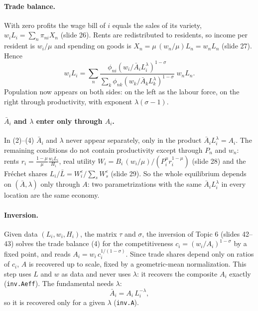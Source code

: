 \documentclass[11pt,a4paper]{article}
\begin{document}
\paragraph{Trade balance.} With zero profits the wage bill of $i$ equals the sales of its variety, $w_iL_i=\sum_n\pi_{ni}X_n$ (slide 26). Rents are redistributed to residents, so income per resident is $w_i/\mu$ and spending on goods is $X_n=\mu\,(w_n/\mu)L_n=w_nL_n$ (slide 27). Hence
\begin{equation}
w_iL_i=\sum_n
\frac{\phi_{ni}\left(w_i/\bar A_iL_i^{\lambda}\right)^{1-\sigma}}
{\sum_k\phi_{nk}\left(w_k/\bar A_kL_k^{\lambda}\right)^{1-\sigma}}\;w_nL_n .
\end{equation}
Population now appears on both sides: on the left as the labour force, on the right through productivity, with exponent $\lambda(\sigma-1)$.

\paragraph{$\bar A_i$ and $\lambda$ enter only through $A_i$.} In (2)--(4) $\bar A_i$ and $\lambda$ never appear separately, only in the product $\bar A_iL_i^{\lambda}=A_i$. The remaining conditions do not contain productivity except through $P_n$ and $w_n$: rents $r_i=\frac{1-\mu}{\mu}\frac{w_iL_i}{H_i}$, real utility $W_i=B_i\,(w_i/\mu)/(P_i^{\mu}r_i^{1-\mu})$ (slide 28) and the Fréchet shares $L_i/\bar L=W_i^{\varepsilon}/\sum_sW_s^{\varepsilon}$ (slide 29). So the whole equilibrium depends on $(\bar A,\lambda)$ only through $A$: two parametrizations with the same $\bar A_iL_i^{\lambda}$ in every location are the same economy.

\paragraph{Inversion.} Given data $(L_i,w_i,H_i)$, the matrix $\tau$ and $\sigma$, the inversion of Topic 6 (slides 42--43) solves the trade balance (4) for the competitiveness $c_i=(w_i/A_i)^{1-\sigma}$ by a fixed point, and reads $A_i=w_i\,c_i^{1/(1-\sigma)}$. Since trade shares depend only on ratios of $c_i$, $A$ is recovered up to scale, fixed by a geometric-mean normalization. This step uses $L$ and $w$ as data and never uses $\lambda$: it recovers the composite $A_i$ exactly (\texttt{inv.Aeff}). The fundamental needs $\lambda$:
\begin{equation}
\bar A_i=A_i\,L_i^{-\lambda},
\end{equation}
so it is recovered only for a given $\lambda$ (\texttt{inv.A}).
\end{document}
